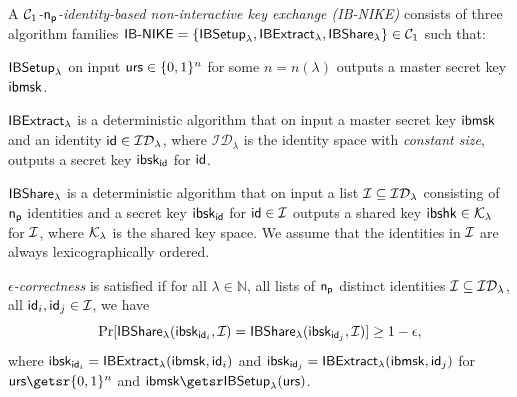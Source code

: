 \begin{definition}
	A \emph{$\mathcal{C}_1$-$\mathsf{n_p}$-identity-based non-interactive key exchange (IB-NIKE)} consists of three algorithm families $\mathsf{IB\text{-}NIKE}=\{\mathsf{IBSetup}_{\lambda}, \allowbreak \mathsf{IBExtract}_{\lambda},\allowbreak \mathsf{IBShare}_{\lambda}\} \allowbreak \in \mathcal{C}_1$ such that:
	\begin{compactitem}
		\item $\mathsf{IBSetup}_{\lambda}$ on input $\mathsf{urs} \in \{0, 1\}^{n}$ for some $n = n(\lambda)$ outputs a master secret key $\mathsf{ibmsk}$. 
		\item $\mathsf{IBExtract}_{\lambda}$ is a deterministic algorithm that on input a master secret key $\mathsf{ibmsk}$ and an identity $\mathsf{id} \in \mathcal{ID}_{\lambda}$, where $\mathcal{ID}_{\lambda}$ is the identity space with \emph{constant size}, outputs a secret key $\mathsf{ibsk}_{\mathsf{id}}$ for $\mathsf{id}$.
		\item $\mathsf{IBShare}_{\lambda}$ is a deterministic algorithm that on input a list $\mathcal{I} \subseteq \mathcal{ID}_{\lambda}$ consisting of $\mathsf{n_p}$ identities and a secret key $\mathsf{ibsk}_{\mathsf{id}}$ for $\mathsf{id} \in \mathcal{I}$   outputs a shared key $\mathsf{ibshk}\in\mathcal K_{\lambda}$ for $\mathcal{I}$, where $\mathcal K_{\lambda}$ is the shared key space. We assume that the identities in $\mathcal{I}$ are always lexicographically ordered.
	\end{compactitem} 
	
	\emph{$\epsilon$-correctness} is satisfied if for all $\lambda \in \mathbb{N}$, all lists of $\mathsf{n_p}$ distinct identities $\mathcal{I} \subseteq \mathcal{ID}_{\lambda}$, all $\mathsf{id}_i, \mathsf{id}_j \in \mathcal{I}$, we have 
%	
	$$ \Pr[\mathsf{IBShare}_{\lambda}(\mathsf{ibsk}_{\mathsf{id}_i}, \mathcal{I}) = \mathsf{IBShare}_{\lambda}(\mathsf{ibsk}_{\mathsf{id}_j}, \mathcal{I})] \geq 1-\epsilon, $$
	where $\mathsf{ibsk}_{\mathsf{id}_i} = \mathsf{IBExtract}_{\lambda}(\mathsf{ibmsk}, \mathsf{id}_{i})$ and $\mathsf{ibsk}_{\mathsf{id}_j} = \mathsf{IBExtract}_{\lambda}(\mathsf{ibmsk}, \mathsf{id}_{j})$ for $\urs \getsr \bin^{n}$ and $\ibmsk \getsr \ibsetup(\urs)$.
	

\end{definition}
